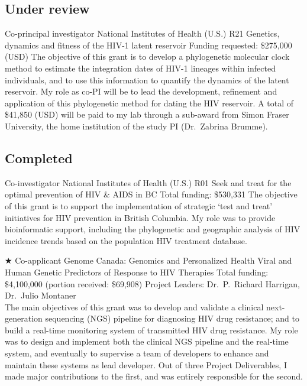 \documentclass[11pt]{moderncv}
\begin{document}
\vspace{1em}

\subsection {Under review}


{Co-principal investigator}
{National Institutes of Health (U.S.) R21} %
{Genetics, dynamics and fitness of the HIV-1 latent reservoir}
{Funding requested: \$275,000 (USD)}
{
The objective of this grant is to develop a phylogenetic molecular clock method to estimate the integration dates of HIV-1 lineages within infected individuals, and to use this information to quantify the dynamics of the latent reservoir.
My role as co-PI will be to lead the development, refinement and application of this phylogenetic method for dating the HIV reservoir.
A total of \$41,850 (USD) will be paid to my lab through a sub-award from Simon Fraser University, the home institution of the study PI (Dr.~Zabrina Brumme).
}



\vspace{1em}

\subsection {Completed}

{Co-investigator}
{National Institutes of Health (U.S.) R01}
{Seek and treat for the optimal prevention of HIV \& AIDS in BC}
{Total funding: \$530,331}
{
The objective of this grant is to support the implementation of strategic `test and treat' initiatives for HIV prevention in British Columbia.
My role was to provide bioinformatic support, including the phylogenetic and geographic analysis of HIV incidence trends based on the population HIV treatment database.\\
}



{$\bigstar$ Co-applicant}
{Genome Canada: Genomics and Personalized Health}
{Viral and Human Genetic Predictors of Response to HIV Therapies}
{Total funding: \$4,100,000 (portion received: \$69,908)}
{
Project Leaders: Dr.~P.~Richard Harrigan, Dr.~Julio Montaner\\
The main objectives of this grant was to develop and validate a clinical next-generation sequencing (NGS) pipeline for diagnosing HIV drug resistance;
and to build a real-time monitoring system of transmitted HIV drug resistance.
My role was to design and implement both the clinical NGS pipeline and the real-time system, and eventually to supervise a team of developers to enhance and maintain these systems as lead developer.
Out of three Project Deliverables, I made major contributions to the first, and was entirely responsible for the second.\\
}
\end{document}
